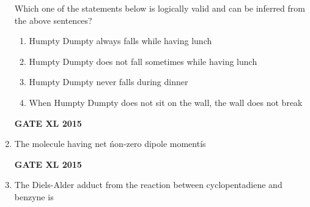 \documentclass[journal,12pt,onecolumn]{IEEEtran}
\begin{document}
\begin{enumerate}
Which one of the statements below is logically valid and can be inferred from the above sentences?
    \begin{enumerate}
            \item Humpty Dumpty always falls while having lunch  
            \item Humpty Dumpty does not fall sometimes while having lunch
            \item Humpty Dumpty never falls during dinner
            \item When Humpty Dumpty does not sit on the wall, the wall does not break
    \end{enumerate}
\begin{flushright}\textbf{GATE XL 2015}\end{flushright}
\item The molecule having net \' non-zero dipole moment\' is
    \begin{enumerate}
    \end{enumerate}
\begin{flushright}\textbf{GATE XL 2015}\end{flushright}
\item The Diels-Alder adduct from the reaction between cyclopentadiene and benzyne is
    \begin{enumerate}
\end{enumerate}
\end{enumerate}
\end{document}
